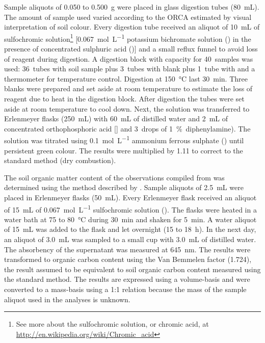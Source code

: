 Sample aliquots of \num{0.050} to \SI{0.500}{\gram} were placed in glass digestion tubes 
(\SI{80}{\milli\liter}). The amount of sample used varied according to the ORCA estimated by visual 
interpretation of soil colour. Every digestion tube received an aliquot of \SI{10}{\milli\liter} of 
sulfochromic solution\footnote{See more about the sulfochromic solution, or chromic acid, at
\url{http://en.wikipedia.org/wiki/Chromic_acid}} [\SI{0.067}{\mole\per\liter} potassium bichromate solution
() in the presence of concentrated sulphuric acid ()] and a small reflux funnel 
to avoid loss of reagent during digestion. A digestion block with capacity for \num{40}~samples was used:
\num{36}~tubes with soil sample plus \num{3}~tubes with blank plus \num{1}~tube with  and a
thermometer for temperature control. Digestion at \SI{150}{\celsius} last \SI{30}{\minute}. Three blanks 
were prepared and set aside at room temperature to estimate the loss of reagent due to heat in the digestion 
block. After digestion the tubes were set aside at room temperature to cool down. Next, the solution was 
transferred to Erlenmeyer flasks (\SI{250}{\milli\liter}) with \SI{60}{\milli\liter} of distilled water and
\SI{2}{\milli\liter} of concentrated orthophosphoric acid [] and \num{3}~drops of 
\SI{1}{\percent}~diphenylamine). The solution was titrated using \SI{0.1}{\mole\per\liter} ammonium ferrous
sulphate () until persistent green colour. The results were multiplied by \num{1.11}
to correct to the standard method (dry combustion).

The soil organic matter content of the observations compiled from  was determined 
using the method described by . Sample aliquots of \SI{2.5}{\milli\liter}
were placed in Erlenmeyer flasks (\SI{50}{\milli\liter}). Every Erlenmeyer flask received an aliquot of 
\SI{15}{\milli\liter} of \SI{0.067}{\mole\per\liter} sulfochromic solution (). The 
flasks were heated in a water bath at \num{75} to \SI{80}{\celsius} during \SI{30}{\minute} and shaken 
for \SI{5}{\minute}. A water aliquot of \SI{15}{\milli\liter} was added to the flask and let overnight 
(\num{15} to \SI{18}{\hour}). In the next day, an aliquot of \SI{3.0}{\milli\liter} was sampled to a 
small cup with \SI{3.0}{\milli\liter} of distilled water. The absorbency of the supernatant was measured 
at \SI{645}{\nano\metre}. The results were transformed to organic carbon content using the Van Bemmelen 
factor (\num{1.724}), the result assumed to be equivalent to soil organic carbon content measured using the 
standard method. The results are expressed using a volume-basis and were converted to a mass-basis using a
1:1 relation because the mass of the sample aliquot used in the analyses is unknown.

